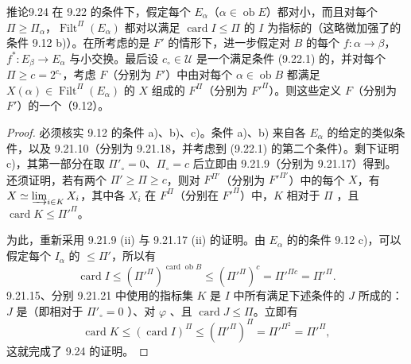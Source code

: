 \begin{SGAresult}{推论}{9.24}
在 9.22 的条件下，假定每个 $E_\alpha$（$\alpha\in\operatorname{ob}E$）都对小，而且对每个 $\Pi\geq\Pi_\alpha$，$\operatorname{Filt}^\Pi(E_\alpha)$ 都对以满足 $\operatorname{card}I\leq\Pi$ 的 $I$ 为指标的（这略微加强了的条件 9.12 b)）。在所考虑的是 $F'$ 的情形下，进一步假定对 $B$ 的每个 $f:\alpha\to\beta$， $f^*:E_\beta\to E_\alpha$ 与小交换。最后设 $c_\circ\in\mathcal U$ 是一个满足条件 (9.22.1) 的，并对每个 $\Pi\geq c=2^{c_\circ}$，考虑 $F$（分别为 $F'$）中由对每个 $\alpha\in\operatorname{ob}B$ 都满足 $X(\alpha)\in\operatorname{Filt}^\Pi(E_\alpha)$ 的 $X$ 组成的 $F^\Pi$（分别为 $F'^\Pi$）。则这些定义 $F$（分别为 $F'$）的一个（9.12）。
\end{SGAresult}
\begin{proof}
必须核实 9.12 的条件 a)、b)、c)。条件 a)、b) 来自各 $E_\alpha$ 的给定的类似条件，以及 9.21.10（分别为 9.21.18，并考虑到 (9.22.1) 的第二个条件）。剩下证明 c)，其第一部分在取 $\Pi'_\circ=0$、$\Pi_\circ=c$ 后立即由 9.21.9（分别为 9.21.17）得到。还须证明，若有两个 $\Pi'\geq\Pi\geq c$，则对 $F^{\Pi'}$（分别为 $F'^{\Pi'}$）中的每个 $X$，有 $X\simeq\varinjlim_{i\in K}X_i$，其中各 $X_i$ 在 $F^\Pi$（分别在 $F'^\Pi$）中，$K$ 相对于 $\Pi$ ，且 $\operatorname{card}K\leq\Pi'^\Pi$。

为此，重新采用 9.21.9 (ii) 与 9.21.17 (ii) 的证明。由 $E_\alpha$ 的的条件 9.12 c)，可以假定每个 $I_\alpha$ 的 $\leq\Pi'$，所以有
\[
\operatorname{card}I\leq(\Pi'^\Pi)^{\operatorname{card}\operatorname{ob}B}
\leq(\Pi'^\Pi)^c=\Pi'^{\Pi c}=\Pi'^\Pi.
\]
9.21.15、分别 9.21.21 中使用的指标集 $K$ 是 $I$ 中所有满足下述条件的 $J$ 所成的：$J$ 是（即相对于 $\Pi'_\circ=0$ ）、对 $\varphi$ 、且 $\operatorname{card}J\leq\Pi$。立即有
\[
\operatorname{card}K\leq(\operatorname{card}I)^\Pi
\leq(\Pi'^\Pi)^\Pi=\Pi'^{\Pi^2}=\Pi'^\Pi,
\]
这就完成了 9.24 的证明。
\end{proof}

